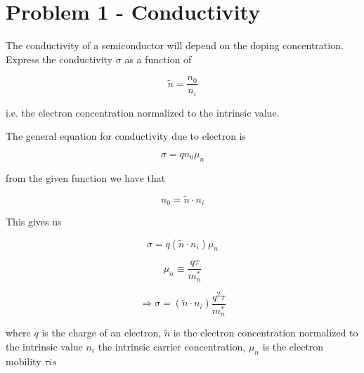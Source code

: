 \section{Problem 1 - Conductivity}

The conductivity of a semiconductor will depend on the doping concentration. Express the conductivity $\sigma$ as a function of

\begin{equation*}
     \tilde{n}=\frac{n_{0}}{n_{i}} 
\end{equation*}

i.e. the electron concentration normalized to the intrinsic value.

The general equation for conductivity due to electron is 

\begin{equation*}
    \sigma=q n_0 \mu_{n} 
\end{equation*}

from the given function we have that 

\begin{equation*}
    n_0=\tilde{n}\cdot n_i
\end{equation*}

This gives us

\begin{equation*}
    \sigma=q (\tilde{n}\cdot n_i) \mu_{n} 
\end{equation*}

\begin{equation*}
    \mu_{n} \equiv \frac{q \tau}{m_{n}^{*}}
\end{equation*}


\begin{equation*}
    \Rightarrow \sigma=(\tilde{n}\cdot n_i) \frac{q^2\tau}{m_{n}^{*}}
\end{equation*}

where $q$ is the charge of an electron, $\tilde{n}$ is the electron concentration normalized to the intrinsic value $n_i$ the intrinsic carrier concentration, $\mu_{n}$ is the electron mobility $\tau is $



